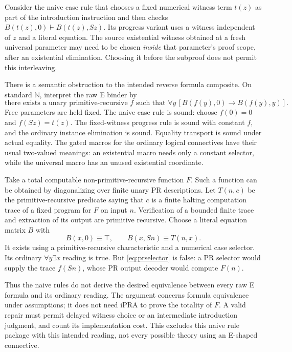 \documentclass[11pt,letterpaper]{article}
\theoremstyle{definition}\newtheorem{definition}[theorem]{Definition}
\theoremstyle{remark}\newtheorem{remark}[theorem]{Remark}
\begin{document}
Consider the naive case rule that chooses a fixed numerical witness
term $t(z)$ as part of the introduction instruction and then checks
$B(t(z),0)\vdash B(t(z),Sz)$. Its progress variant uses a witness
independent of $z$ and a literal equation. The source existential
witness obtained at a fresh universal parameter may need to be chosen
\emph{inside} that parameter's proof scope, after an existential
elimination. Choosing it before the subproof does not permit this
interleaving.

There is a semantic obstruction to the intended reverse formula
composite. On standard $\mathbb N$, interpret the raw E binder by
\[
 \text{there exists a unary primitive-recursive }f\text{ such that }
 \forall y\,[B(f(y),0)\to B(f(y),y)].
 \tag{PR-selector reading}\label{eq:prselector}
\]
Free parameters are held fixed. The naive case rule is sound: choose
$f(0)=0$ and $f(Sz)=t(z)$. The fixed-witness progress rule is sound
with constant $f$, and the ordinary instance elimination is sound.
Equality transport is sound under actual equality. The gated macros
for the ordinary logical connectives have their usual two-valued
meanings: an existential macro needs only a constant selector, while
the universal macro has an unused existential coordinate.

Take a total computable non-primitive-recursive function $F$. Such a
function can be obtained by diagonalizing over finite unary PR
descriptions. Let $T(n,c)$ be the primitive-recursive predicate saying
that $c$ is a finite halting computation trace of a fixed program for
$F$ on input $n$. Verification of a bounded finite trace and extraction
of its output are primitive recursive. Choose a literal equation matrix
$B$ with
\[
        B(x,0)\equiv\top,\qquad B(x,Sn)\equiv T(n,x).
\]
It exists using a primitive-recursive characteristic and a numerical
case selector. Its ordinary $\forall y\exists x$ reading is true.
But \eqref{eq:prselector} is false: a PR selector would supply the
trace $f(Sn)$, whose PR output decoder would compute $F(n)$.

Thus the naive rules do not derive the desired equivalence between
every raw E formula and its ordinary reading. The argument concerns
formula equivalence under assumptions; it does not need iPRA to prove
the totality of $F$. A valid repair must permit delayed witness choice
or an intermediate introduction judgment, and count its implementation
cost. This excludes this naive rule package with this intended reading,
not every possible theory using an E-shaped connective.
\end{document}
